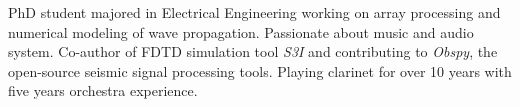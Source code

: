 

\begin{cvparagraph}

PhD student majored in Electrical Engineering working on array processing and numerical modeling of wave propagation. Passionate about music and audio system. Co-author of FDTD simulation tool \textit{S3I} and contributing to \textit{Obspy}, the open-source seismic signal processing tools. Playing clarinet for over 10 years with five years orchestra experience.
\end{cvparagraph}
